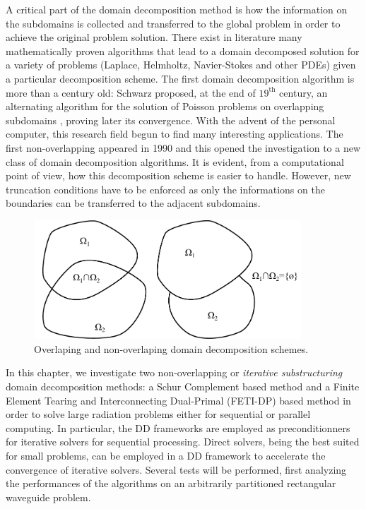 A critical part of the domain decomposition method is how the information on the subdomains is collected and transferred to the global problem in order to achieve the original problem solution. There exist in literature \cite{toselli2005domain, mathew2008domain} many mathematically proven algorithms that lead to a domain decomposed solution for a variety of problems (Laplace, Helmholtz, Navier-Stokes and other PDEs) given a particular decomposition scheme. The first domain decomposition algorithm is more than a century old: Schwarz proposed, at the end of $19^\mathrm{th}$ century, an alternating algorithm for the solution of Poisson problems on overlapping subdomains \cite{schwarz1972gesammelte}, proving later its convergence. With the advent of the personal computer, this research field begun to find many interesting applications. The first non-overlapping appeared in 1990 \cite{lions1990schwarz} and this opened the investigation to a new class of domain decomposition algorithms. It is evident, from a computational point of view, how this decomposition scheme is easier to handle. However, new truncation conditions have to be enforced as only the informations on the boundaries can be transferred to the adjacent subdomains.

\begin{figure}[ht!]
\centering
\includegraphics[width=10cm]{DDnonoverlaping}
\caption{Overlaping and non-overlaping domain decomposition schemes.}
\label{fig:DDnonoverlaping}
\end{figure}

In this chapter, we investigate two non-overlapping or \textit{iterative substructuring} domain decomposition methods: a Schur Complement based method and a Finite Element Tearing and Interconnecting Dual-Primal (FETI-DP) based method in order to solve large radiation problems either for sequential or parallel computing. In particular, the DD frameworks are employed as preconditionners for iterative solvers for sequential processing. Direct solvers, being the best suited for small problems, can be employed in a DD framework to accelerate the convergence of iterative solvers. Several tests will be performed, first analyzing the performances of the algorithms on an arbitrarily partitioned rectangular waveguide problem.

